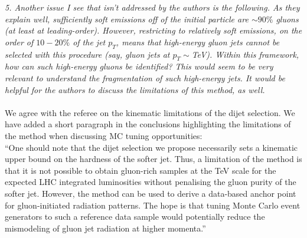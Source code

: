 \documentclass[a4paper,11pt]{article}
\begin{document}
\noindent\textit{5. Another issue I see that isn’t addressed by the authors is the following. As they explain well, sufficiently soft emissions off of the initial particle are $\sim 90\%$ gluons (at least at leading-order). However, restricting to relatively soft emissions, on the order of $10−20\%$ of the jet $p_T$​, means that high-energy gluon jets cannot be selected with this procedure (say, gluon jets at $p_T\sim$​ TeV). Within this framework, how can such high-energy gluons be identified? This would seem to be very relevant to understand the fragmentation of such high-energy jets. It would be helpful for the authors to discuss the limitations of this method, as well.
}
\\
\\
We agree with the referee on the kinematic limitations of the dijet selection. We have added a short paragraph in the conclusions highlighting the limitations of the method when discussing MC tuning opportunities:
\\

``One should note that the dijet selection we propose necessarily sets a kinematic upper bound on the hardness of the softer jet. Thus, a limitation of the method is that it is not possible to obtain gluon-rich
samples at the TeV scale for the expected LHC integrated luminosities without penalising
the gluon purity of the softer jet. However, the method can be used to derive a data-based
anchor point for gluon-initiated radiation patterns. The hope is that tuning Monte Carlo
event generators to such a reference data sample would potentially reduce the mismodeling
of gluon jet radiation at higher momenta.''
\end{document}
